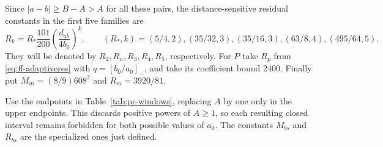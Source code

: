 \documentclass[12pt]{article}
\numberwithin{equation}{section}
\begin{document}
Since $|a-b|\ge B-A>A$ for all these pairs, the distance-sensitive
residual constants in the first five families are
\begin{equation*}
 R_k=R_*\frac{101}{200}\left(\frac{d_{ab}}{4b_0}\right)^k,
 \qquad (R_*,k)=
 (5/4,2),(35/32,3),(35/16,3),(63/8,4),(495/64,5).
\end{equation*}
They will be denoted by $R_2,R_n,R_3,R_4,R_5$, respectively.
For $P$ take $R_p$ from \eqref{eq:ff-adaptiveres} with
$q=[b_0/a_0]_-$, and take its coefficient bound $2400$.
Finally put $M_m=(8/9)608^2$ and $R_m=3920/81$.

Use the endpoints in Table~\ref{tab:pr-windows}, replacing $A$ by
one only in the upper endpoints. This discards positive powers of
$A\ge1$, so each resulting closed interval remains forbidden for
both possible values of $a_0$. The constants $M_{bs}$ and $R_{bs}$
are the specialized ones just defined.
\end{document}
